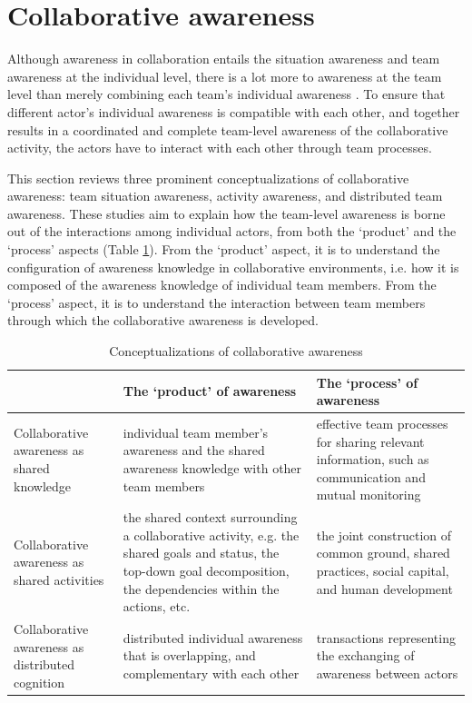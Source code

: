 \section{Collaborative awareness} %
\label{sec:awareness_in_collaboration}
Although awareness in collaboration entails the situation awareness and team awareness at the individual level, there is a lot more to awareness at the team level than merely combining each team's individual awareness \cite{salas1995situation}. To ensure that different actor's individual awareness is compatible with each other, and together results in a coordinated and complete team-level awareness of the collaborative activity, the actors have to interact with each other through team processes.

This section reviews three prominent conceptualizations of collaborative awareness: team situation awareness, activity awareness, and distributed team awareness. These studies aim to explain how the team-level awareness is borne out of the interactions among individual actors, from both the `product' and the `process' aspects (Table \ref{tab:collaborative_awareness}). From the `product' aspect, it is to understand the configuration of awareness knowledge in collaborative environments, i.e. how it is composed of the awareness knowledge of individual team members. From the `process' aspect, it is to understand the interaction between team members through which the collaborative awareness is developed. 
\begin{table}[htbp]
\centering
\footnotesize
\begin{tabular}{>{\raggedright}p{1.1in}>{\raggedright}p{2.2in}>{\raggedright}p{2.2in}}
   \toprule 
    & \textbf{The `product' of awareness} & \textbf{The `process' of awareness}\tabularnewline
   \midrule 
   Collaborative awareness as shared knowledge & individual team member\textquoteright{}s awareness and the shared
   awareness knowledge with other team members & effective team processes for sharing relevant information, such as
   communication and mutual monitoring\tabularnewline
   \midrule 
   Collaborative awareness as shared activities & the shared context surrounding a collaborative activity, e.g. the shared
   goals and status, the top-down goal decomposition, the dependencies
   within the actions, etc. & the joint construction of common ground, shared practices, social
   capital, and human development\tabularnewline
   \midrule 
   Collaborative awareness as distributed cognition & distributed individual awareness that is overlapping, and complementary
   with each other & transactions representing the exchanging of awareness between actors\tabularnewline
   \bottomrule
\end{tabular}  
\caption{Conceptualizations of collaborative awareness}
\label{tab:collaborative_awareness}
\end{table}

